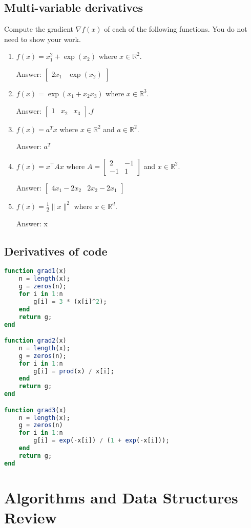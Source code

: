 \documentclass{article}
\def\ans#1{\par\gre{Answer: #1}}
\def\blu#1{{\color{blu}#1}}
\def\gre#1{{\color{gre}#1}}
\def\norm#1{\|#1\|}
\def\R{\mathbb{R}}
\begin{document}
\subsection{Multi-variable derivatives}

\blu{Compute the gradient $\nabla f(x)$ of each of the following functions.} You do not need to show your work.
\begin{enumerate}
\item $f(x) = x_1^2 + \exp(x_2)$ where $x \in \R^2$.
\ans{$\left[\begin{array}{cc} 2x_1 & \exp(x_2) \end{array}\right]$}
\item $f(x) = \exp(x_1 + x_2x_3)$ where $x \in \mathbb{R}^3$.
\ans{$\left[\begin{array}{ccc} 1 & x_2 & x_3 \end{array}\right].f$}
\item $f(x) = a^Tx$ where $x \in \R^2$ and $a \in \R^2$.
\ans{$a^T$}
\item $f(x) = x^\top A x$ where $A=\left[ \begin{array}{cc}
2 & -1 \\
 -1 & 1 \end{array} \right]$ and $x \in \mathbb{R}^2$.
\ans{$\left[\begin{array}{cc} 4x_1 - 2x_2 & 2x_2 - 2x_1 \end{array}\right]$}
\item $f(x) = \frac{1}{2}\norm{x}^2$ where $x \in \R^d$.
\ans{x}
\end{enumerate}

\subsection{Derivatives of code}

\begin{lstlisting}[language=julia, frame=single]
function grad1(x)
	n = length(x);
	g = zeros(n);
	for i in 1:n
		g[i] = 3 * (x[i]^2);
	end
	return g;
end

function grad2(x)
	n = length(x);
	g = zeros(n);
	for i in 1:n
		g[i] = prod(x) / x[i];
	end
	return g;
end

function grad3(x)
	n = length(x);
	g = zeros(n)
	for i in 1:n
		g[i] = exp(-x[i]) / (1 + exp(-x[i]));
	end
	return g;
end
\end{lstlisting}

\section{Algorithms and Data Structures Review}
\end{document}
